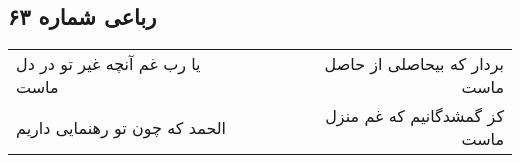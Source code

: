 \begin{center}
\section*{رباعی شماره ۶۳}
\label{sec:sh063}
\begin{longtable}{l p{0.5cm} r}
یا رب غم آنچه غیر تو در دل ماست
&&
بردار که بیحاصلی از حاصل ماست
\\
الحمد که چون تو رهنمایی داریم
&&
کز گمشدگانیم که غم منزل ماست
\\
\end{longtable}
\end{center}

